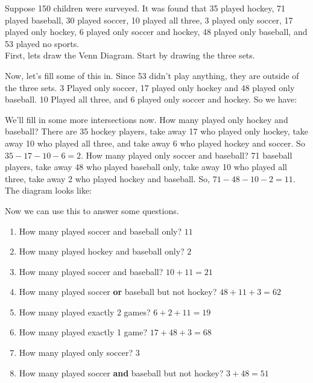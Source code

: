 \begin{boxexample}{}{}
	Suppose 150 children were surveyed. It was found that 35 played hockey, 71 played baseball, 30 played soccer, 10 played all three, 3 played only soccer, 17 played only hockey, 6 played only soccer and hockey, 48 played only baseball, and 53 played no sports.\\

	First, lets draw the Venn Diagram. Start by drawing the three sets.

	\begin{venndiagram3sets}[shade=skyblue,labelA={H},labelB={B},labelC={S},labelNotABC={$\mathcal{U}$}]
	\end{venndiagram3sets}

	Now, let's fill some of this in. Since 53 didn't play anything, they are outside of the three sets. 3 Played only soccer, 17 played only hockey and 48 played only baseball. 10 Played all three, and 6 played only soccer and hockey. So we have:

	\begin{venndiagram3sets}[shade=skyblue,labelA={H},labelB={B},labelC={S},labelNotABC={\quad $\mathcal{U} \quad 53$},labelOnlyA={17},labelOnlyB={48},labelOnlyC={3},labelABC={10},labelOnlyAC={6}]
	\end{venndiagram3sets}

	We'll fill in some more intersections now. How many played only hockey and baseball? There are 35 hockey players, take away 17 who played only hockey, take away 10 who played all three, and take away 6 who played hockey and soccer. So $35-17-10-6=2$. How many played only soccer and baseball? 71 baseball players, take away 48 who played baseball only, take away 10 who played all three, take away 2 who played hockey and baseball. So, $71-48-10-2=11$. The diagram looks like:

	\begin{venndiagram3sets}[shade=skyblue,labelA={H},labelB={B},labelC={S},labelNotABC={\quad $\mathcal{U} \quad 53$},labelOnlyA={17},labelOnlyB={48},labelOnlyC={3},labelABC={10},labelOnlyAB={2},labelOnlyBC={11},labelOnlyAC={6}]
	\end{venndiagram3sets}

	Now we can use this to answer some questions.
	\begin{enumerate}
		\item How many played soccer and baseball only? $11$
		\item How many played hockey and baseball only? $2$
		\item How many played soccer and baseball? $10+11=21$
		\item How many played soccer {\bf or} baseball but not hockey? $48+11+3=62$
		\item How many played exactly 2 games? $6+2+11=19$
		\item How many played exactly 1 game? $17+48+3=68$
		\item How many played only soccer? $3$
		\item How many played soccer {\bf and} baseball but not hockey? $3+48=51$
	\end{enumerate}
\end{boxexample}

